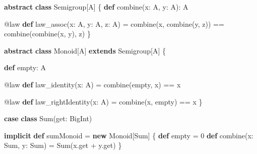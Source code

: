 \documentclass[
  ignorenonframetext,
]{beamer}
\newenvironment{Shaded}{}{}
\newcommand{\DecValTok}[1]{\textcolor[rgb]{0.25,0.63,0.44}{#1}}
\newcommand{\FunctionTok}[1]{\textcolor[rgb]{0.02,0.16,0.49}{#1}}
\newcommand{\KeywordTok}[1]{\textcolor[rgb]{0.00,0.44,0.13}{\textbf{#1}}}
\newcommand{\NormalTok}[1]{#1}
\begin{document}
\begin{frame}[fragile]

\begin{Shaded}
\begin{Highlighting}[]
\KeywordTok{abstract} \KeywordTok{class}\NormalTok{ Semigroup[A] \{}
  \KeywordTok{def} \FunctionTok{combine}\NormalTok{(x: A, y: A): A}

\NormalTok{  @law }\KeywordTok{def} \FunctionTok{law_assoc}\NormalTok{(x: A, y: A, z: A) =}
    \FunctionTok{combine}\NormalTok{(x, }\FunctionTok{combine}\NormalTok{(y, z)) == }\FunctionTok{combine}\NormalTok{(}\FunctionTok{combine}\NormalTok{(x, y), z)}
\NormalTok{\}}
\end{Highlighting}
\end{Shaded}

\end{frame}

\begin{frame}[fragile]

\begin{Shaded}
\begin{Highlighting}[]
\KeywordTok{abstract} \KeywordTok{class}\NormalTok{ Monoid[A]}
  \KeywordTok{extends}\NormalTok{ Semigroup[A] \{}

  \KeywordTok{def}\NormalTok{ empty: A}

\NormalTok{  @law }\KeywordTok{def} \FunctionTok{law_identity}\NormalTok{(x: A) =}
    \FunctionTok{combine}\NormalTok{(empty, x) == x}

\NormalTok{  @law }\KeywordTok{def} \FunctionTok{law_rightIdentity}\NormalTok{(x: A) =}
    \FunctionTok{combine}\NormalTok{(x, empty) == x}
\NormalTok{\}}
\end{Highlighting}
\end{Shaded}

\end{frame}

\begin{frame}[fragile]

\begin{Shaded}
\begin{Highlighting}[]
\KeywordTok{case} \KeywordTok{class} \FunctionTok{Sum}\NormalTok{(get: BigInt)}

\KeywordTok{implicit} \KeywordTok{def}\NormalTok{ sumMonoid = }\KeywordTok{new}\NormalTok{ Monoid[Sum] \{}
  \KeywordTok{def}\NormalTok{ empty = }\DecValTok{0}
  \KeywordTok{def} \FunctionTok{combine}\NormalTok{(x: Sum, y: Sum) = }\FunctionTok{Sum}\NormalTok{(x.}\FunctionTok{get}\NormalTok{ + y.}\FunctionTok{get}\NormalTok{)}
\NormalTok{\}}
\end{Highlighting}
\end{Shaded}

\end{frame}
\end{document}
